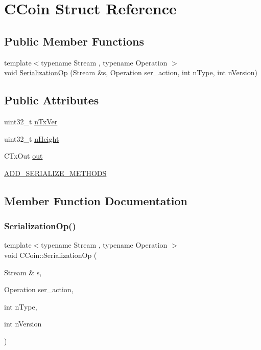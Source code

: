 \hypertarget{struct_c_coin}{}\section{C\+Coin Struct Reference}
\label{struct_c_coin}
\subsection*{Public Member Functions}
\begin{DoxyCompactItemize}
\item 
{\footnotesize template$<$typename Stream , typename Operation $>$ }\\void \mbox{\hyperlink{struct_c_coin_a374076e3c11d34ca84213d49f5d29cb7}{Serialization\+Op}} (Stream \&s, Operation ser\+\_\+action, int n\+Type, int n\+Version)
\end{DoxyCompactItemize}
\subsection*{Public Attributes}
\begin{DoxyCompactItemize}
\item 
uint32\+\_\+t \mbox{\hyperlink{struct_c_coin_a15fff0a242b693debd526affc73fd146}{n\+Tx\+Ver}}
\item 
uint32\+\_\+t \mbox{\hyperlink{struct_c_coin_aaec259d22f0c76fa7716f03587d3407b}{n\+Height}}
\item 
C\+Tx\+Out \mbox{\hyperlink{struct_c_coin_a15c9b12a37610f0295326529fee9afea}{out}}
\item 
\mbox{\hyperlink{struct_c_coin_aa537b3f37a44008828036e8a9b866cd2}{A\+D\+D\+\_\+\+S\+E\+R\+I\+A\+L\+I\+Z\+E\+\_\+\+M\+E\+T\+H\+O\+DS}}
\end{DoxyCompactItemize}


\subsection{Member Function Documentation}
\mbox{\label{struct_c_coin_a374076e3c11d34ca84213d49f5d29cb7}} 
\subsubsection{\texorpdfstring{Serialization\+Op()}{SerializationOp()}}
{\footnotesize\ttfamily template$<$typename Stream , typename Operation $>$ \\
void C\+Coin\+::\+Serialization\+Op (\begin{DoxyParamCaption}\item[{Stream \&}]{s,  }\item[{Operation}]{ser\+\_\+action,  }\item[{int}]{n\+Type,  }\item[{int}]{n\+Version }\end{DoxyParamCaption})\hspace{0.3cm}{\ttfamily [inline]}}



